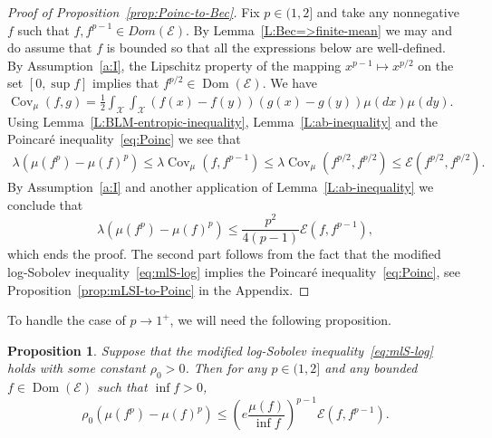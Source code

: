 \documentclass[a4paper]{amsart}
\newtheorem{proposition}[theorem]{Proposition} %
\theoremstyle{definition}
\theoremstyle{remark}
\numberwithin{equation}{section}
\newcommand{\calX}{\mathcal{X}}
\DeclareMathOperator{\Dom}{Dom} %
\newcommand*{\calE}{\mathcal{E}}
\DeclareMathOperator{\Cov}{Cov}	%
\begin{document}
\begin{proof}[Proof of Proposition~\ref{prop:Poinc-to-Bec}]
	Fix $p\in(1,2]$ and take any nonnegative $f$ such that $f,f^{p-1}\in Dom(\calE)$.
  By Lemma~\ref{L:Bec=>finite-mean} we may and do assume that $f$ is bounded so that all the expressions below are well-defined.
	By Assumption~\ref{a:I}, the Lipschitz property of the mapping $x^{p-1}\mapsto x^{p/2}$ on the set $[0,\sup f]$ implies that $f^{p/2}\in \Dom(\calE)$.
	We have $\Cov_\mu(f,g) = \frac{1}{2} \int_\calX\int_\calX (f(x)- f(y))(g(x)-g(y))\mu(dx)\mu(dy)$.
	Using Lemma~\ref{L:BLM-entropic-inequality}, Lemma~\ref{L:ab-inequality} and the Poincar\'e inequality~\eqref{eq:Poinc} we see that
	\begin{align*}
		\lambda(\mu (f^p) - \mu(f)^p )
		\le
		\lambda\Cov_\mu(f,f^{p-1})
		\le
		\lambda\Cov_\mu (f^{p/2},f^{p/2})
		\le
		\calE(f^{p/2},f^{p/2}).
	\end{align*}	
	By Assumption~\ref{a:I} and another application of Lemma~\ref{L:ab-inequality} we conclude that
	\[
		\lambda(\mu (f^p) - \mu(f)^p )
		\le
		\frac{p^2}{4(p-1)}\calE(f,f^{p-1}),
	\]
	which ends the proof.
	The second part follows from the fact that the modified log-Sobolev inequality~\eqref{eq:mlS-log} implies the Poincar\'e inequality~\eqref{eq:Poinc}, see Proposition~\ref{prop:mLSI-to-Poinc} in the Appendix.
\end{proof}

To handle the case of $p \to 1^+$, we will need the following proposition.

\begin{proposition}
\label{P:intf/minf}
Suppose that the modified log-Sobolev inequality~\eqref{eq:mlS-log} holds with some constant $\rho_0>0$.
	Then for any $p\in(1,2]$ and any bounded $f\in \Dom(\calE)$ such that $\inf f>0$,
	\[
		\rho_0(\mu (f^p) - \mu(f)^p)
		\le
		\left(e\frac{\mu(f)}{\inf f}\right)^{p-1}
		\calE(f,f^{p-1}).
	\]	
\end{proposition}
\end{document}
